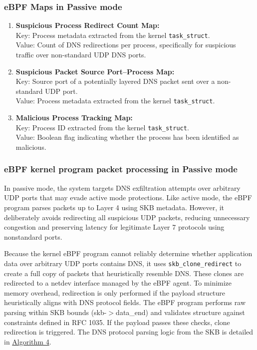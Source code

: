 \documentclass [11pt, proquest] {uwthesis}[2020/02/24]
\begin{document}
\subsubsection{\textbf{eBPF Maps in Passive mode}}
\begin{enumerate}[itemsep=1pt,parsep=0pt]

\item \textbf{Suspicious Process Redirect Count Map:} \\
Key: Process metadata extracted from the kernel \texttt{task\_struct}. \\
Value: Count of DNS redirections per process, specifically for suspicious traffic over non-standard UDP DNS ports.

\item \textbf{Suspicious Packet Source Port–Process Map:} \\
Key: Source port of a potentially layered DNS packet sent over a non-standard UDP port. \\
Value: Process metadata extracted from the kernel \texttt{task\_struct}.

\item \textbf{Malicious Process Tracking Map:} \\
Key: Process ID extracted from the kernel \texttt{task\_struct}. \\
Value: Boolean flag indicating whether the process has been identified as malicious.
\end{enumerate}

\subsubsection{\textbf{eBPF kernel program packet processing in Passive mode}}
\label{passive:sec1}
In passive mode, the system targets DNS exfiltration attempts over arbitrary UDP ports that may evade active mode protections. Like active mode, the eBPF program parses packets up to Layer 4 using SKB metadata. However, it deliberately avoids redirecting all suspicious UDP packets, reducing unnecessary congestion and preserving latency for legitimate Layer 7 protocols using nonstandard ports.

Because the kernel eBPF program cannot reliably determine whether application data over arbitrary UDP ports contains DNS, it uses \texttt{skb\_clone\_redirect} to create a full copy of packets that heuristically resemble DNS. These clones are redirected to a netdev interface managed by the eBPF agent. To minimize memory overhead, redirection is only performed if the payload structure heuristically aligns with DNS protocol fields. The eBPF program performs raw parsing within SKB bounds (skb-$>$data\_end) and validates structure against constraints defined in RFC 1035. If the payload passes these checks, clone redirection is triggered. The DNS protocol parsing logic from the SKB is detailed in \hyperref[sec:alg4]{Algorithm 4}.
\end{document}
